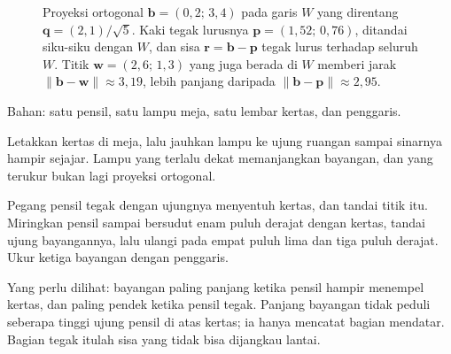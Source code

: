 \begin{figure}[htbp]
\centering
{}
\caption{Proyeksi ortogonal $\mathbf{b}=(0{,}2;\,3{,}4)$ pada garis $W$ yang
direntang $\mathbf{q}=(2,1)/\sqrt{5}$. Kaki tegak lurusnya
$\mathbf{p}=(1{,}52;\,0{,}76)$, ditandai siku-siku dengan $W$, dan sisa
$\mathbf{r}=\mathbf{b}-\mathbf{p}$ tegak lurus terhadap seluruh $W$. Titik
$\mathbf{w}=(2{,}6;\,1{,}3)$ yang juga berada di $W$ memberi jarak
$\|\mathbf{b}-\mathbf{w}\|\approx3{,}19$, lebih panjang daripada
$\|\mathbf{b}-\mathbf{p}\|\approx2{,}95$.}
\label{fig:proyeksi-sisa}
\end{figure}

\begin{tangan}
Bahan: satu pensil, satu lampu meja, satu lembar kertas, dan penggaris.

Letakkan kertas di meja, lalu jauhkan lampu ke ujung ruangan sampai sinarnya hampir sejajar. Lampu yang terlalu dekat memanjangkan bayangan, dan yang terukur bukan lagi proyeksi ortogonal.

Pegang pensil tegak dengan ujungnya menyentuh kertas, dan tandai titik itu. Miringkan pensil sampai bersudut enam puluh derajat dengan kertas, tandai ujung bayangannya, lalu ulangi pada empat puluh lima dan tiga puluh derajat. Ukur ketiga bayangan dengan penggaris.

Yang perlu dilihat: bayangan paling panjang ketika pensil hampir menempel kertas, dan paling pendek ketika pensil tegak. Panjang bayangan tidak peduli seberapa tinggi ujung pensil di atas kertas; ia hanya mencatat bagian mendatar. Bagian tegak itulah sisa yang tidak bisa dijangkau lantai.
\end{tangan}

